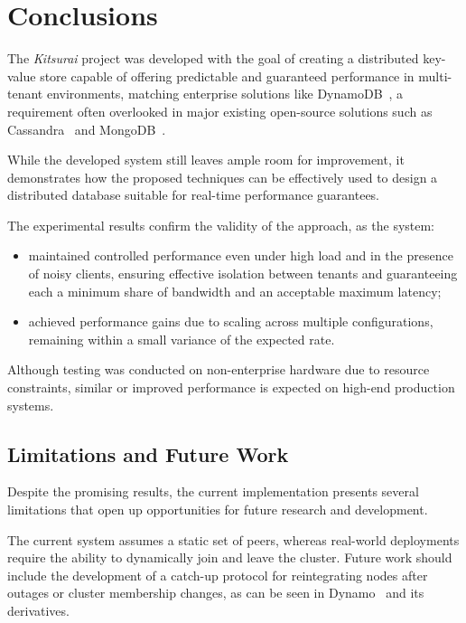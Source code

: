 \section{Conclusions}
\label{sec:conclusions}

The \textit{Kitsurai} project was developed with the goal of creating a distributed key-value store
capable of offering predictable and guaranteed performance in multi-tenant environments,
matching enterprise solutions like DynamoDB~\cite{Dynamo2022},
a requirement often overlooked in major existing open-source solutions such as Cassandra~\cite{Cassandra} and MongoDB~\cite{RT-Mongo}.

While the developed system still leaves ample room for improvement,
it demonstrates how the proposed techniques can be effectively used to design
a distributed database suitable for real-time performance guarantees.

The experimental results confirm the validity of the approach, as the system:
\begin{itemize}
    \item maintained controlled performance even under high load and in the presence of noisy clients,
    ensuring effective isolation between tenants and guaranteeing each a minimum share of bandwidth and an acceptable maximum latency;
    \item achieved performance gains due to scaling across multiple configurations, remaining within a small variance of the expected rate.
\end{itemize}
Although testing was conducted on non-enterprise hardware due to resource constraints,
similar or improved performance is expected on high-end production systems.

\subsection{Limitations and Future Work}
\label{subsec:limitations+future-work}

Despite the promising results, the current implementation presents several limitations that open up
opportunities for future research and development.

The current system assumes a static set of peers,
whereas real-world deployments require the ability to dynamically join and leave the cluster.
Future work should include the development of a catch-up protocol for reintegrating nodes after outages or cluster membership changes,
as can be seen in Dynamo~\cite{Dynamo2007} and its derivatives.

